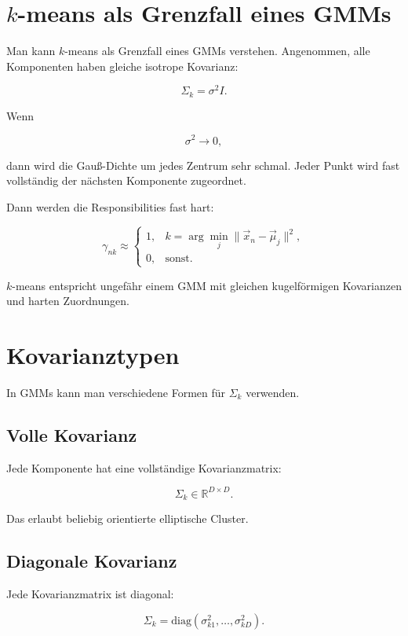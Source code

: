 \section{\(k\)-means als Grenzfall eines GMMs}

Man kann \(k\)-means als Grenzfall eines GMMs verstehen.
Angenommen, alle Komponenten haben gleiche isotrope Kovarianz:

\[
    \Sigma_k=\sigma^2 I.
\]

Wenn

\[
    \sigma^2\to 0,
\]

dann wird die Gauß-Dichte um jedes Zentrum sehr schmal.
Jeder Punkt wird fast vollständig der nächsten Komponente zugeordnet.

Dann werden die Responsibilities fast hart:

\[
    \gamma_{nk}
    \approx
    \begin{cases}
        1, & k=\arg\min_j\|\vec{x}_n-\vec{\mu}_j\|^2, \\
        0, & \text{sonst}.
    \end{cases}
\]

\begin{conceptbox}
\(k\)-means entspricht ungefähr einem GMM mit gleichen kugelförmigen Kovarianzen und harten Zuordnungen.
\end{conceptbox}

\section{Kovarianztypen}

In GMMs kann man verschiedene Formen für \(\Sigma_k\) verwenden.

\subsection{Volle Kovarianz}

Jede Komponente hat eine vollständige Kovarianzmatrix:

\[
    \Sigma_k\in\mathbb{R}^{D\times D}.
\]

Das erlaubt beliebig orientierte elliptische Cluster.

\subsection{Diagonale Kovarianz}

Jede Kovarianzmatrix ist diagonal:

\[
    \Sigma_k
    =
    \mathrm{diag}
    (\sigma_{k1}^2,\dots,\sigma_{kD}^2).
\]

